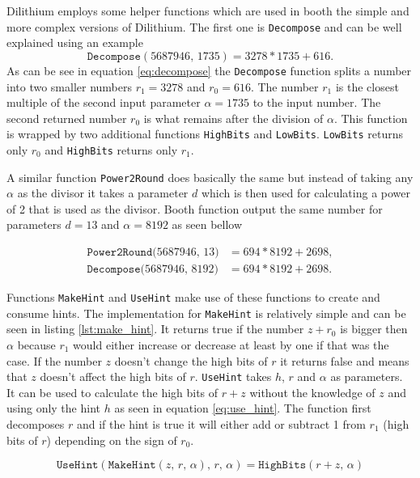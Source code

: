 Dilithium employs some helper functions which are used in booth the simple and more complex versions of Dilithium. The first one is \texttt{Decompose} and can be well explained using an example
\begin{equation}
  \label{eq:decompose}
  \mathrm{\texttt{Decompose}}(5687946,\,1735)=3278*1735+616.
\end{equation}
\noindent As can be see in equation \ref{eq:decompose} the \texttt{Decompose} function splits a number into two smaller numbers $r_1=3278$ and $r_0=616$. The number $r_1$ is the closest multiple of the second input parameter $\alpha=1735$ to the input number. The second returned number $r_0$ is what remains after the division of $\alpha$. This function is wrapped by two additional functions \texttt{HighBits} and \texttt{LowBits}. \texttt{LowBits} returns only $r_0$ and \texttt{HighBits} returns only $r_1$.

A similar function \texttt{Power2Round} does basically the same but instead of taking any $\alpha$ as the divisor it takes a parameter $d$ which is then used for calculating a power of 2 that is used as the divisor. Booth function output the same number for parameters $d=13$ and $\alpha=8192$ as seen bellow

\begin{align}
  \mathrm{\texttt{Power2Round}}(5687946,\,13\mathrm)&=694*8192+2698, \\
  \mathrm{\texttt{Decompose}}(5687946,\,8192\mathrm)&=694*8192+2698.
\end{align}

Functions \texttt{MakeHint} and \texttt{UseHint} make use of these functions to create and consume hints. The implementation for \texttt{MakeHint} is relatively simple and can be seen in listing \ref{lst:make_hint}. It returns true if the number $z+r_0$ is bigger then $\alpha$ because $r_1$ would either increase or decrease at least by one if that was the case. If the number $z$ doesn't change the high bits of $r$ it returns false and means that $z$ doesn't affect the high bits of $r$.
\noindent\texttt{UseHint} takes $h$, $r$ and $\alpha$ as parameters. It can be used to calculate the high bits of $r+z$ without the knowledge of $z$ and using only the hint $h$ as seen in equation \ref{eq:use_hint}. The function first decomposes $r$ and if the hint is true it will either add or subtract 1 from $r_1$ (high bits of $r$) depending on the sign of $r_0$.

\begin{equation}
  \label{eq:use_hint}
  \mathrm{\texttt{UseHint}}(\mathrm{\texttt{MakeHint}}(z,\,r,\,\alpha),\,r,\,\alpha)=\mathrm{\texttt{HighBits}}(r+z,\,\alpha)
\end{equation}